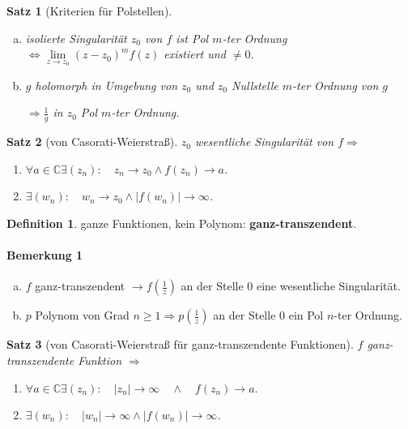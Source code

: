 \documentclass[ngerman,halfparskip]{scrartcl}
\newtheorem*{satz*}{Satz}
\theoremstyle{definition}
\newtheorem*{defin}{Definition}
\def\C{\mathbb C}
\begin{document}
\begin{satz*}[Kriterien für Polstellen]~

\begin{enumerate}[a)]
\item isolierte Singularität $z_0$ von $f$ ist Pol $m$-ter Ordnung $\Leftrightarrow \lim\limits_{z\rightarrow z_0} (z-z_0)^mf(z)$ existiert und $\neq 0$.
\item $g$ holomorph in Umgebung von $z_0$ und $z_0$ Nullstelle $m$-ter Ordnung von $g$

$\Rightarrow \frac 1g$ in $z_0$ Pol $m$-ter Ordnung.

\end{enumerate}
\end{satz*}

\begin{satz*}[von Casorati-Weierstraß]
$z_0$ wesentliche Singularität von $f \Rightarrow$
\begin{enumerate}
\item $\forall a\in\C \exists (z_n): \quad z_n\rightarrow z_0 \land f(z_n)\rightarrow a$.
\item $\exists (w_n): \quad w_n\rightarrow z_0 \land |f(w_n)|\rightarrow\infty$.
\end{enumerate}
\end{satz*}

\begin{defin}
ganze Funktionen, kein Polynom: \textbf{ganz-transzendent}.
\end{defin}

\paragraph{Bemerkung 1} \begin{enumerate}[a)]
\item $f$ ganz-transzendent $\rightarrow f(\frac 1z)$ an der Stelle $0$ eine wesentliche Singularität.
\item $p$ Polynom von Grad $n\geq 1 \Rightarrow p(\frac 1z)$ an der Stelle $0$ ein Pol $n$-ter Ordnung.
\end{enumerate}

 \begin{satz*}[von Casorati-Weierstraß für ganz-transzendente Funktionen]
 $f$ ganz-transzendente Funktion $\Rightarrow$
 \begin{enumerate}
\item $\forall a\in\C\exists (z_n):\quad |z_n|\rightarrow \infty \quad \land \quad f(z_n)\rightarrow a.$
\item $\exists (w_n):\quad |w_n|\rightarrow \infty \land |f(w_n)|\rightarrow \infty$.
\end{enumerate}
\end{satz*}
\end{document}

